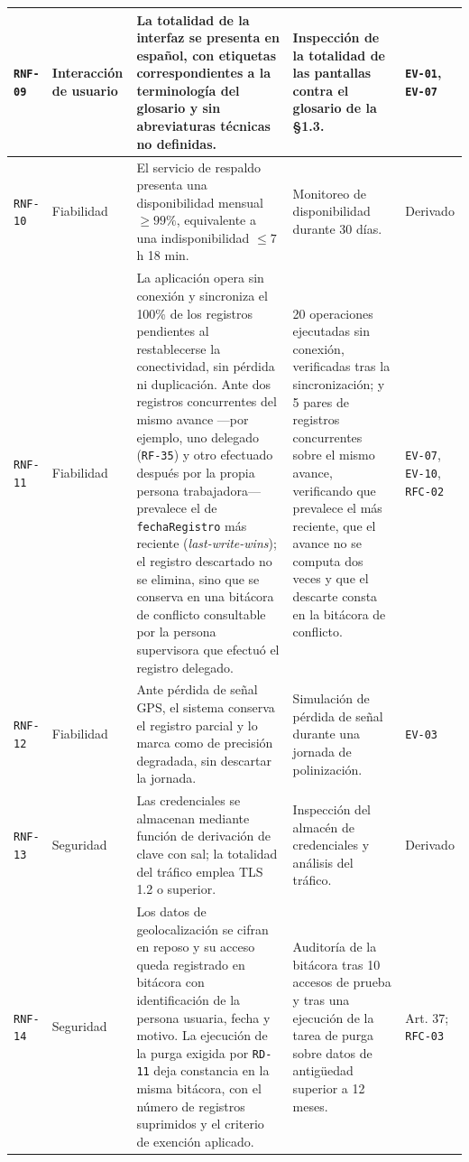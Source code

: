 \documentclass[11pt,a4paper]{article}
\newcommand{\id}[1]{\texttt{\begingroup\hyphenpenalty=10000\relax#1\endgroup}}
\renewcommand{\id}[1]{\texttt{#1}}
\begin{document}
{\begin{longtable}{|C{1.2cm}|L{2.4cm}|L{5.8cm}|L{3.1cm}|L{2.2cm}|}
\id{RNF-09} & Interacción de usuario & La totalidad de la interfaz se presenta en español, con etiquetas correspondientes a la terminología del glosario y sin abreviaturas técnicas no definidas. & Inspección de la totalidad de las pantallas contra el glosario de la §1.3. & \id{EV-01}, \id{EV-07} \\ \hline
\id{RNF-10} & Fiabilidad & El servicio de respaldo presenta una disponibilidad mensual $\geq 99\%$, equivalente a una indisponibilidad $\leq 7$ h 18 min. & Monitoreo de disponibilidad durante 30 días. & \footnotesize Derivado \\ \hline
\id{RNF-11} & Fiabilidad & La aplicación opera sin conexión y sincroniza el 100\% de los registros pendientes al restablecerse la conectividad, sin pérdida ni duplicación. Ante dos registros concurrentes del mismo avance ---por ejemplo, uno delegado (\id{RF-35}) y otro efectuado después por la propia persona trabajadora--- prevalece el de \id{fechaRegistro} más reciente (\emph{last-write-wins}); el registro descartado no se elimina, sino que se conserva en una bitácora de conflicto consultable por la persona supervisora que efectuó el registro delegado. & 20 operaciones ejecutadas sin conexión, verificadas tras la sincronización; y 5 pares de registros concurrentes sobre el mismo avance, verificando que prevalece el más reciente, que el avance no se computa dos veces y que el descarte consta en la bitácora de conflicto. & \id{EV-07}, \id{EV-10}, \id{RFC-02} \\ \hline
\id{RNF-12} & Fiabilidad & Ante pérdida de señal GPS, el sistema conserva el registro parcial y lo marca como de precisión degradada, sin descartar la jornada. & Simulación de pérdida de señal durante una jornada de polinización. & \footnotesize \id{EV-03} \\ \hline
\id{RNF-13} & Seguridad & Las credenciales se almacenan mediante función de derivación de clave con sal; la totalidad del tráfico emplea TLS 1.2 o superior. & Inspección del almacén de credenciales y análisis del tráfico. & \footnotesize Derivado \\ \hline
\id{RNF-14} & Seguridad & Los datos de geolocalización se cifran en reposo y su acceso queda registrado en bitácora con identificación de la persona usuaria, fecha y motivo. La ejecución de la purga exigida por \id{RD-11} deja constancia en la misma bitácora, con el número de registros suprimidos y el criterio de exención aplicado. & Auditoría de la bitácora tras 10 accesos de prueba y tras una ejecución de la tarea de purga sobre datos de antigüedad superior a 12 meses. & \footnotesize \cite{lopdp} Art. 37; \id{RFC-03} \\ \hline

\end{longtable}}
\end{document}
